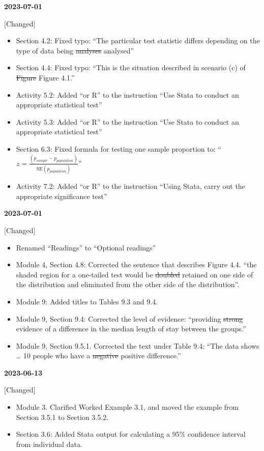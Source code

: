 \documentclass[
  a4paper,
]{memoir}
\providecommand{\tightlist}{%
  \setlength{\itemsep}{0pt}\setlength{\parskip}{0pt}}\usepackage{longtable,booktabs,array}
\begin{document}
\textbf{2023-07-01}

{[}Changed{]}

\begin{itemize}
\tightlist
\item
  Section 4.2: Fixed typo: ``The particular test statistic differs
  depending on the type of data being \st{analyses} analysed''
\item
  Section 4.4: Fixed typo: ``This is the situation described in scenario
  (c) of \st{Figure} Figure 4.1.''
\item
  Activity 5.2: Added ``or R'' to the instruction ``Use Stata to conduct
  an appropriate statistical test''
\item
  Activity 5.3: Added ``or R'' to the instruction ``Use Stata to conduct
  an appropriate statistical test''
\item
  Section 6.3: Fixed formula for testing one sample proportion to:
  ``\(z = \frac{(p_{sample} - p_{population})}{\text{SE}(p_{population})}\)''
\item
  Activity 7.2: Added ``or R'' to the instruction ``Using Stata, carry
  out the appropriate significance test''
\end{itemize}

\textbf{2023-07-01}

{[}Changed{]}

\begin{itemize}
\tightlist
\item
  Renamed ``Readings'' to ``Optional readings''
\item
  Module 4, Section 4.8: Corrected the sentence that describes Figure
  4.4. ``the shaded region for a one-tailed test would be \st{doubled}
  retained on one side of the distribution and eliminated from the other
  side of the distribution''.
\item
  Module 9: Added titles to Tables 9.3 and 9.4.
\item
  Module 9, Section 9.4: Corrected the level of evidence: ``providing
  \st{strong} evidence of a difference in the median length of stay
  between the groups.''
\item
  Module 9, Section 9.5.1. Corrected the text under Table 9.4: ``The
  data shows \ldots{} 10 people who have a \st{negative} positive
  difference.''
\end{itemize}

\textbf{2023-06-13}

{[}Changed{]}

\begin{itemize}
\tightlist
\item
  Module 3. Clarified Worked Example 3.1, and moved the example from
  Section 3.5.1 to Section 3.5.2.
\item
  Section 3.6: Added Stata output for calculating a 95\% confidence
  interval from individual data.
\end{itemize}
\end{document}
